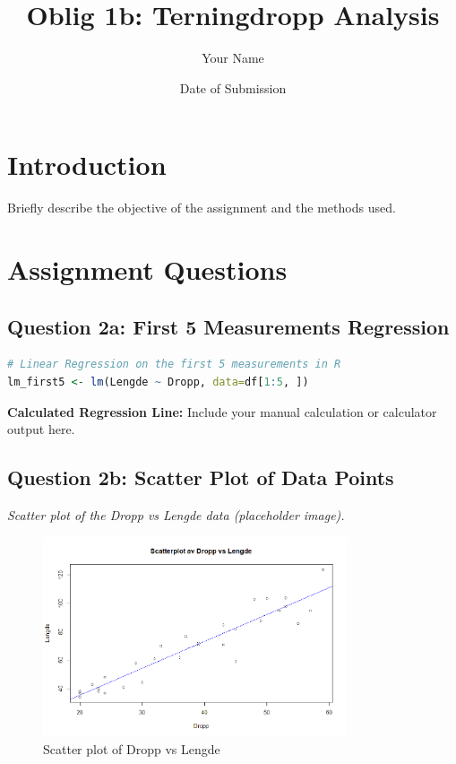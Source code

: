 \documentclass{article}
\title{Oblig 1b: Terningdropp Analysis}
\author{Your Name}
\date{Date of Submission}
\begin{document}
\maketitle

\section{Introduction}
Briefly describe the objective of the assignment and the methods used.

\section{Assignment Questions}

\subsection{Question 2a: First 5 Measurements Regression}
\begin{lstlisting}[language=R]
# Linear Regression on the first 5 measurements in R
lm_first5 <- lm(Lengde ~ Dropp, data=df[1:5, ])
\end{lstlisting}
\textbf{Calculated Regression Line:} Include your manual calculation or calculator output here.

\subsection{Question 2b: Scatter Plot of Data Points}
\textit{Scatter plot of the Dropp vs Lengde data (placeholder image).}
\begin{figure}[h]
    \centering
    \includegraphics[width=0.8\textwidth]{Rplot02.png}
    \caption{Scatter plot of Dropp vs Lengde}
\end{figure}
\end{document}
